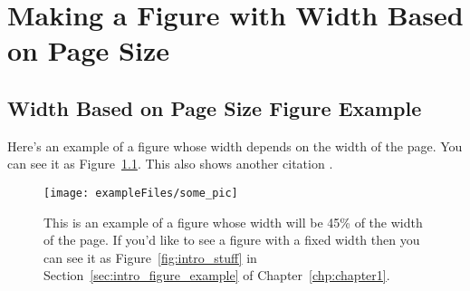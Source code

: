 \chapter{Making a Figure with Width Based on Page Size}
\label{apdx:appendixa}

\section{Width Based on Page Size Figure Example} \label{sec:appendixa_figure_example}
Here's an example of a figure whose width depends on the width
of the page. You can see it as Figure~\ref{fig:appendix_some_pic}. This also shows another citation \cite{aeyels86local}.

\begin{figure}[htbp]
  \centering
  \texttt{[image: exampleFiles/some\_pic]}
  \caption[Example figure whose width depends on page size]{
    This is an example of a figure whose width will be 45\% of the
    width of the page. If you'd like to see a figure with a fixed
    width then you can see it as Figure~\ref{fig:intro_stuff} in
    Section~\ref{sec:intro_figure_example} of Chapter~\ref{chp:chapter1}.}
  \label{fig:appendix_some_pic}
\end{figure}